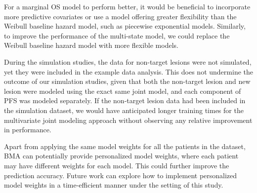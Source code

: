 \documentclass[aoas]{imsart}
\theoremstyle{plain}
\theoremstyle{remark}
\begin{document}
For a marginal OS model to perform better, it would be beneficial to incorporate more predictive covariates or use a model offering greater flexibility than the Weibull baseline hazard model, such as piecewise exponential models. Similarly, to improve the performance of the multi-state model, we could replace the Weibull baseline hazard model with more flexible models.

During the simulation studies, the data for non-target lesions were not simulated, yet they were included in the example data analysis. This does not undermine the outcome of our simulation studies, given that both the non-target lesion and new lesion were modeled using the exact same joint model, and each component of PFS was modeled separately. If the non-target lesion data had been included in the simulation dataset, we would have anticipated longer training times for the multivariate joint modeling approach without observing any relative improvement in performance.

Apart from applying the same model weights for all the patients in the dataset, BMA can potentially provide personalized model weights, where each patient may have different weights for each model. This could further improve the prediction accuracy. Future work can explore how to implement personalized model weights in a time-efficient manner under the setting of this study.




\begin{supplement}
\end{supplement}
\begin{supplement}
\end{supplement}
\end{document}
